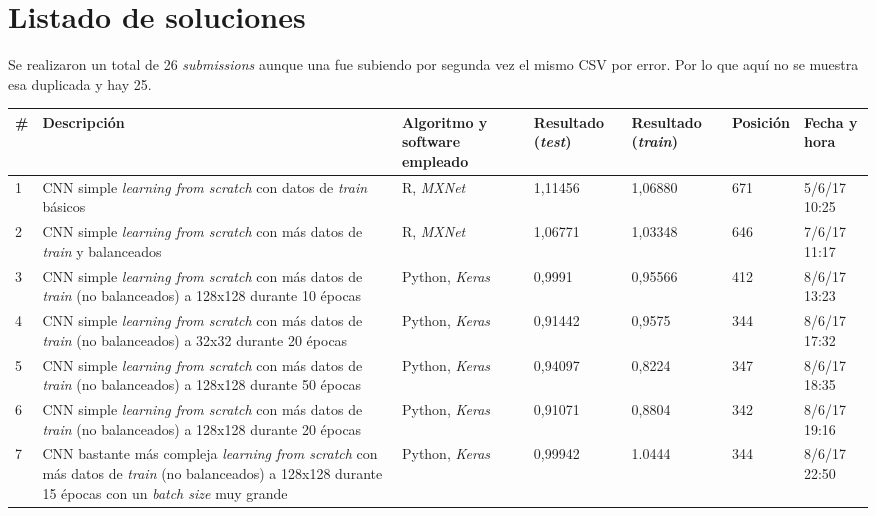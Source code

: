 \section{Listado de soluciones}

Se realizaron un total de 26 \textit{submissions} aunque una fue subiendo por segunda vez el mismo CSV por error. Por lo que aquí no se  muestra esa duplicada y hay 25.

\begin{longtable}{|
		p{}|
		p{}|
		p{}|
		p{}|
		p{}|
		p{}|
		p{}|
	}
	\hline
	\# & Descripción & Algoritmo y software empleado & Resultado (\textit{test}) & Resultado (\textit{train}) & Posición & Fecha y hora \\
	\hline
	\hline
	1 & CNN simple \textit{learning from scratch} con datos de \textit{train} básicos & R, \textit{MXNet} & 1,11456 & 1,06880 & 671 & 5/6/17 10:25 \\
	\hline 
	2 & CNN simple \textit{learning from scratch} con más datos de \textit{train} y balanceados & R, \textit{MXNet} & 1,06771 & 1,03348 & 646 & 7/6/17 11:17 \\
	\hline 
	3 & CNN simple \textit{learning from scratch} con más datos de \textit{train} (no balanceados) a 128x128 durante 10 épocas & Python, \textit{Keras} & 0,9991 & 0,95566 & 412 & 8/6/17 13:23 \\
	\hline 
	4 & CNN simple \textit{learning from scratch} con más datos de \textit{train} (no balanceados) a 32x32 durante 20 épocas & Python, \textit{Keras} & 0,91442 & 0,9575 & 344 & 8/6/17 17:32 \\
	\hline 
	5 & CNN simple \textit{learning from scratch} con más datos de \textit{train} (no balanceados) a 128x128 durante 50 épocas & Python, \textit{Keras} & 0,94097 & 0,8224 & 347 & 8/6/17 18:35 \\
	\hline 
	6 & CNN simple \textit{learning from scratch} con más datos de \textit{train} (no balanceados) a 128x128 durante 20 épocas & Python, \textit{Keras} & 0,91071 & 0,8804 & 342 & 8/6/17 19:16 \\
	\hline 
	7 & CNN bastante más compleja \textit{learning from scratch} con más datos de \textit{train} (no balanceados) a 128x128 durante 15 épocas con un \textit{batch size} muy grande & Python, \textit{Keras} & 0,99942 & 1.0444 & 344 & 8/6/17 22:50 \\

\end{longtable}
